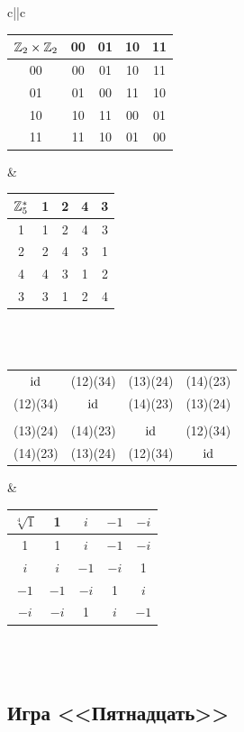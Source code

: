 \begin{enumerate}
\begin{tabular}{c||c}
\\


\begin{tabular}{c|cccc}
$\mathbb Z_2\times\mathbb Z_2$ & 00 & 01 & 10 & 11\\  \hline
00 & 00 & 01 & 10 & 11 \\
01 & 01 & 00 & 11 & 10 \\
10 & 10 & 11 & 00 & 01 \\
11 & 11 & 10 & 01 & 00
\end{tabular}
 &
\begin{tabular}{c|cccc}
$\mathbb Z_5^*$ & 1 & 2 & 4 & 3 \\  \hline
1 & 1 & 2 & 4 & 3 \\
2 & 2 & 4 & 3 & 1\\
4 & 4 & 3 & 1 & 2\\
3 & 3 & 1 & 2 & 4
\end{tabular}
\\
\\

\footnotesize %
\begin{tabular}{cc|cc}
 $\mathrm{id}$    & (12)(34) & (13)(24) & (14)(23) \\[5pt]
 (12)(34) & $\mathrm{id}$    & (14)(23) & (13)(24) \\[3pt]\hline
 &&& \\[-5pt]
 (13)(24) & (14)(23) & $\mathrm{id}$    & (12)(34) \\[5pt]
 (14)(23) & (13)(24) & (12)(34) & $\mathrm{id}$
\end{tabular}
 &
\begin{tabular}{c|cccc}
$\sqrt[4]{1}$ & 1    & $i$  & $-1$ & $-i$ \\  \hline
1             & 1    & $i$  & $-1$ & $-i$ \\
$i$           & $i$  & $-1$ & $-i$ & 1    \\
$-1$          & $-1$ & $-i$ & 1    & $i$  \\
$-i$          & $-i$ & 1    & $i$  & $-1$
\end{tabular}
\\
\\

\hline

\end{tabular}





\subsection*{Игра <<Пятнадцать>>}


\end{enumerate}
